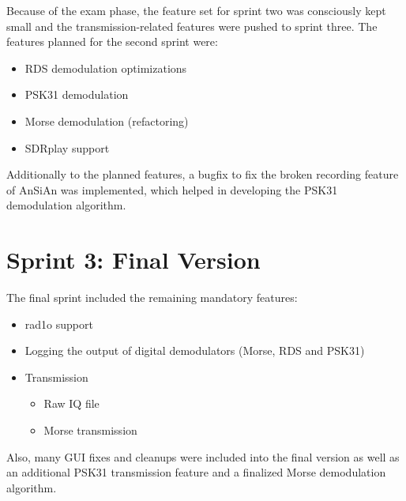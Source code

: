 Because of the exam phase, the feature set for sprint two was consciously
kept small and the transmission-related features were pushed to sprint
three. The features planned for the second sprint were:
\begin{itemize}
	\item RDS demodulation optimizations
	\item PSK31 demodulation
	\item Morse demodulation (refactoring)
	\item SDRplay support
\end{itemize}

Additionally to the planned features, a bugfix to fix the
broken recording feature of \ac{AnSiAn} was implemented, which helped in developing the
PSK31 demodulation algorithm.

\section{Sprint 3: Final Version}

The final sprint included the remaining mandatory features:
\begin{itemize}
	\item rad1o support
	\item Logging the output of digital demodulators (Morse, RDS and PSK31)
	\item Transmission
		\begin{itemize}
			\item Raw IQ file
			\item Morse transmission
		\end{itemize}
\end{itemize}

Also, many \ac{GUI} fixes and cleanups were included into the final version
as well as an additional PSK31 transmission feature and a finalized
Morse demodulation algorithm.

